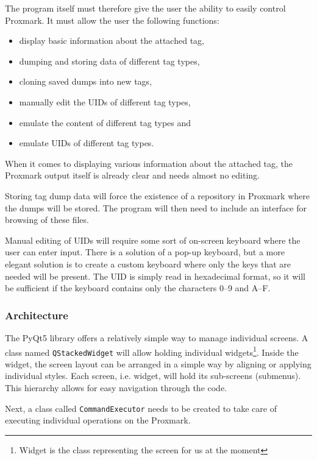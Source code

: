 The program itself must therefore give the user the ability to easily control Proxmark. It must allow the user the following functions:

\begin{itemize}
    \item display basic information about the attached tag,
    \item dumping and storing data of different tag types,
    \item cloning saved dumps into new tags,
    \item manually edit the UIDs of different tag types,
    \item emulate the content of different tag types and
    \item emulate UIDs of different tag types.
\end{itemize}

When it comes to displaying various information about the attached tag, the Proxmark output itself is already clear and needs almost no editing.

Storing tag dump data will force the existence of a repository in Proxmark where the dumps will be stored. The program will then need to include an interface for browsing of these files.

Manual editing of UIDs will require some sort of on-screen keyboard where the user can enter input. There is a solution of a pop-up keyboard, but a more elegant solution is to create a custom keyboard where only the keys that are needed will be present. The UID is simply read in hexadecimal format, so it will be sufficient if the keyboard contains only the characters 0--9 and A--F.

\subsubsection{Architecture}

The PyQt5 library offers a relatively simple way to manage individual screens. A class named \texttt{QStackedWidget} will allow holding individual widgets\footnote{Widget is the class representing the screen for us at the moment}. Inside the widget, the screen layout can be arranged in a simple way by aligning or applying individual styles. Each screen, i.e. widget, will hold its sub-screens (submenus). This hierarchy allows for easy navigation through the code.

Next, a class called \texttt{CommandExecutor} needs to be created to take care of executing individual operations on the Proxmark.

